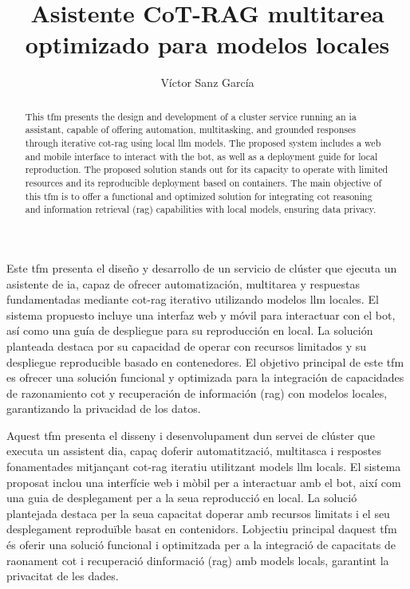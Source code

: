 \documentclass[twoside,spanish,a4paper,12pt]{tfg}
\title{Asistente CoT-RAG multitarea optimizado para modelos locales}
\author{Víctor Sanz García}
\begin{document}
\portada
\cleardoublepage
\contraportada
\cleardoublepage
\declaracion
\cleardoublepage


\begin{resumen}
  Este \gls{tfm} presenta el diseño y desarrollo de un servicio de clúster que ejecuta un asistente de \gls{ia}, capaz de ofrecer automatización, multitarea y respuestas fundamentadas mediante \gls{cot}-\gls{rag} iterativo utilizando modelos \gls{llm} locales. El sistema propuesto incluye una interfaz web y móvil para interactuar con el bot, así como una guía de despliegue para su reproducción en local. La solución planteada destaca por su capacidad de operar con recursos limitados y su despliegue reproducible basado en contenedores.
  El objetivo principal de este \gls{tfm} es ofrecer una solución funcional y optimizada para la integración de capacidades de razonamiento \gls{cot} y recuperación de información (\gls{rag}) con modelos locales, garantizando la privacidad de los datos.
\end{resumen}
\cleardoublepage

\begin{abstract}
  This \gls{tfm} presents the design and development of a cluster service running an \gls{ia} assistant, capable of offering automation, multitasking, and grounded responses through iterative \gls{cot}-\gls{rag} using local \gls{llm} models. The proposed system includes a web and mobile interface to interact with the bot, as well as a deployment guide for local reproduction. The proposed solution stands out for its capacity to operate with limited resources and its reproducible deployment based on containers. The main objective of this \gls{tfm} is to offer a functional and optimized solution for integrating \gls{cot} reasoning and information retrieval (\gls{rag}) capabilities with local models, ensuring data privacy.
\end{abstract}
\cleardoublepage

\begin{resum}
  Aquest \gls{tfm} presenta el disseny i desenvolupament d\textquotesingle un servei de clúster que executa un assistent d\textquotesingle \gls{ia}, capaç d\textquotesingle oferir automatització, multitasca i respostes fonamentades mitjançant \gls{cot}-\gls{rag} iteratiu utilitzant models \gls{llm} locals. El sistema proposat inclou una interfície web i mòbil per a interactuar amb el bot, així com una guia de desplegament per a la seua reproducció en local. La solució plantejada destaca per la seua capacitat d\textquotesingle operar amb recursos limitats i el seu desplegament reproduïble basat en contenidors.
  L\textquotesingle objectiu principal d\textquotesingle aquest \gls{tfm} és oferir una solució funcional i optimitzada per a la integració de capacitats de raonament \gls{cot} i recuperació d\textquotesingle informació (\gls{rag}) amb models locals, garantint la privacitat de les dades.
\end{resum}
\cleardoublepage
\end{document}
